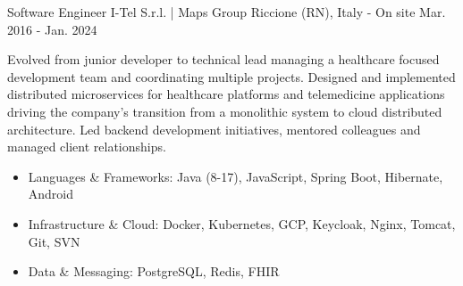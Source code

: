 \begin{cventries}
    \cventry
    {Software Engineer} %
    {I-Tel S.r.l. | Maps Group} %
    {Riccione (RN), Italy - On site} %
    {Mar. 2016 - Jan. 2024} %
    {
        Evolved from junior developer to technical lead managing a healthcare focused development team and coordinating multiple projects. Designed and implemented distributed microservices for healthcare platforms and telemedicine applications driving the company's transition from a monolithic system to cloud distributed architecture. Led backend development initiatives, mentored colleagues and managed client relationships.
        \begin{itemize}
            \item {Languages \& Frameworks: Java (8-17), JavaScript, Spring Boot, Hibernate, Android}
            \item {Infrastructure \& Cloud: Docker, Kubernetes, GCP, Keycloak, Nginx, Tomcat, Git, SVN}
            \item {Data \& Messaging: PostgreSQL, Redis, FHIR}
        \end{itemize}
    }



\end{cventries}
